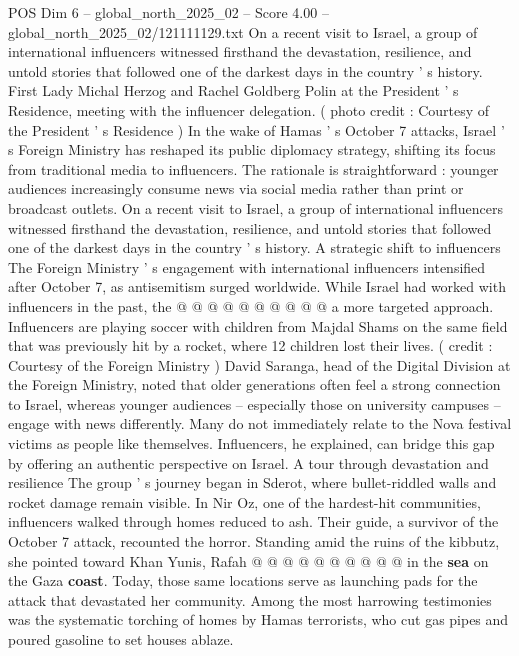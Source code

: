 \begin{textsample}{POS Dim 6 – global\_north\_2025\_02 – Score 4.00 – global\_north\_2025\_02/121111129.txt}  \label{ex:f6_pos_366}
On a recent visit to Israel, a group of international influencers witnessed firsthand the devastation, resilience, and untold stories that followed one of the darkest days in the country ' s history.
First Lady Michal Herzog and Rachel Goldberg Polin at the President ' s Residence, meeting with the influencer delegation. ( photo credit : Courtesy of the President ' s Residence ) In the wake of Hamas ' s October 7 attacks, Israel ' s Foreign Ministry has reshaped its public diplomacy strategy, shifting its focus from traditional media to influencers.
The rationale is straightforward : younger audiences increasingly consume news via social media rather than print or broadcast outlets.
On a recent visit to Israel, a group of international influencers witnessed firsthand the devastation, resilience, and untold stories that followed one of the darkest days in the country ' s history.
A strategic shift to influencers The Foreign Ministry ' s engagement with international influencers intensified after October 7, as antisemitism surged worldwide.
While Israel had worked with influencers in the past, the @ @ @ @ @ @ @ @ @ @ a more targeted approach.
Influencers are playing soccer with children from Majdal Shams on the same field that was previously hit by a rocket, where 12 children lost their lives. ( credit : Courtesy of the Foreign Ministry ) David Saranga, head of the Digital Division at the Foreign Ministry, noted that older generations often feel a strong connection to Israel, whereas younger audiences -- especially those on university campuses -- engage with news differently.
Many do not immediately relate to the Nova festival victims as people like themselves.
Influencers, he explained, can bridge this gap by offering an authentic perspective on Israel.
A tour through devastation and resilience The group ' s journey began in Sderot, where bullet-riddled walls and rocket damage remain visible.
In Nir Oz, one of the hardest-hit communities, influencers walked through homes reduced to ash.
Their guide, a survivor of the October 7 attack, recounted the horror.
Standing amid the ruins of the kibbutz, she pointed toward Khan Yunis, Rafah @ @ @ @ @ @ @ @ @ @ in the \textbf{sea} on the Gaza \textbf{coast}.
Today, those same locations serve as launching pads for the attack that devastated her community.
Among the most harrowing testimonies was the systematic torching of homes by Hamas terrorists, who cut gas pipes and poured gasoline to set houses ablaze.

\end{textsample}
